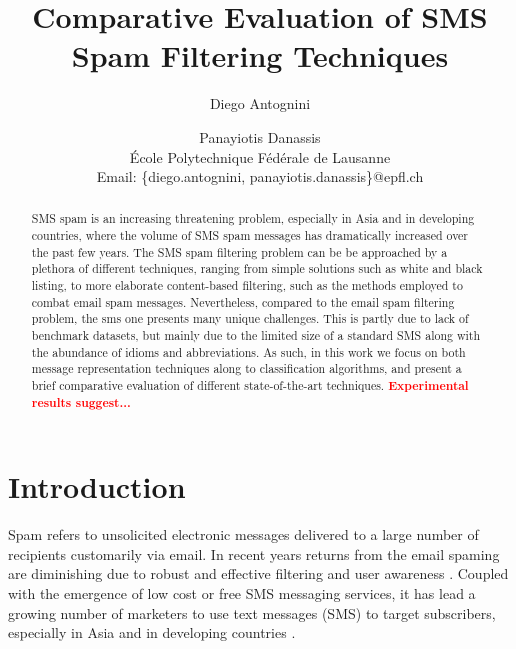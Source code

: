 \documentclass[letterpaper]{article}
\newcommand{\note}[1]{\textbf{\textcolor{red}{#1}}}
\begin{document}
\title{Comparative Evaluation of SMS Spam Filtering Techniques}
\author{Diego Antognini \and Panayiotis Danassis \\
\'Ecole Polytechnique F\'ed\'erale de Lausanne \\
Email: \{diego.antognini, panayiotis.danassis\}@epfl.ch}

\maketitle

\begin{abstract}
	SMS spam is an increasing threatening problem, especially in Asia and in developing countries, where the volume of SMS spam messages has dramatically increased over the past few years. The SMS spam filtering problem can be be approached by a plethora of different techniques, ranging from simple solutions such as white and black listing, to more elaborate content-based filtering, such as the methods employed to combat email spam messages. Nevertheless, compared to the email spam filtering problem, the sms one presents many unique challenges. This is partly due to lack of benchmark datasets, but mainly due to the limited size of a standard SMS along with the abundance of idioms and abbreviations. As such, in this work we focus on both message representation techniques along to classification algorithms, and present a brief comparative evaluation of different state-of-the-art techniques. \note{Experimental results suggest...}
\end{abstract}

\section{Introduction} \label{Introduction}

Spam refers to unsolicited electronic messages delivered to a large number of recipients customarily via email. In recent years returns from the email spaming are diminishing due to robust and effective filtering and user awareness \cite{delany2012sms}. Coupled with the emergence of low cost or free SMS messaging
services, it has lead a growing number of marketers to use text messages (SMS) to target subscribers, especially in Asia and in developing countries \cite{gomez2006content} \cite{yadav2011smsassassin}.
\end{document}
